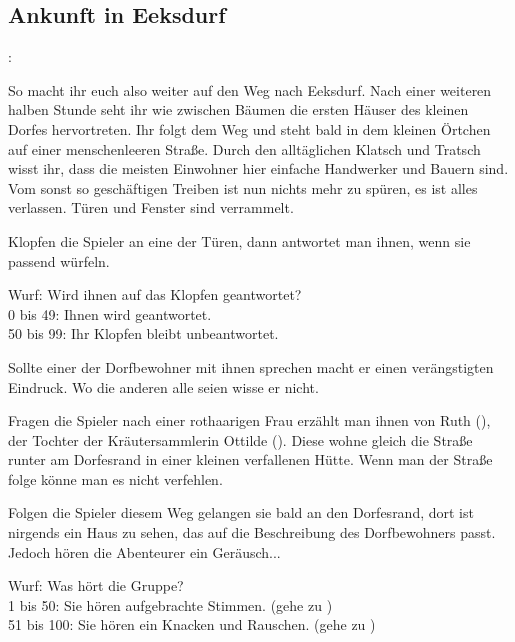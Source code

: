 \subsection*{Ankunft in Eeksdurf}
\label{inxd}

:

So macht ihr euch also weiter auf den Weg nach Eeksdurf. Nach einer weiteren halben Stunde seht ihr wie zwischen Bäumen die ersten Häuser des kleinen Dorfes hervortreten. Ihr folgt dem Weg und steht bald in dem kleinen Örtchen auf einer menschenleeren Straße. Durch den alltäglichen Klatsch und Tratsch wisst ihr, dass die meisten Einwohner hier einfache Handwerker und Bauern sind. Vom sonst so geschäftigen Treiben ist nun nichts mehr zu spüren, es ist alles verlassen. Türen und Fenster sind verrammelt.

Klopfen die Spieler an eine der Türen, dann antwortet man ihnen, wenn sie passend würfeln.

\begin{tcolorbox}
  Wurf: Wird ihnen auf das Klopfen geantwortet? \\
  0 bis 49: Ihnen wird geantwortet. \\
  50 bis 99: Ihr Klopfen bleibt unbeantwortet.\\
\end{tcolorbox}

Sollte einer der Dorfbewohner mit ihnen sprechen macht er einen verängstigten Eindruck. Wo die anderen alle seien wisse er nicht.


Fragen die Spieler nach einer rothaarigen Frau erzählt man ihnen von Ruth (\blue{\ref{Ruth}}), der Tochter der Kräutersammlerin Ottilde (\blue{\ref{Ottilde}}). Diese wohne gleich die Straße runter am Dorfesrand in einer kleinen verfallenen Hütte. Wenn man der Straße folge könne man es nicht verfehlen.


Folgen die Spieler diesem Weg gelangen sie bald an den Dorfesrand, dort ist nirgends ein Haus zu sehen, das auf die Beschreibung des Dorfbewohners passt. Jedoch hören die Abenteurer ein Geräusch...

\begin{tcolorbox}
  Wurf: Was hört die Gruppe? \\
  1 bis 50: Sie hören aufgebrachte Stimmen. (gehe zu \blue{\ref{mob}})\\
  51 bis 100: Sie hören ein Knacken und Rauschen. (gehe zu \blue{\ref{feuer}})\\
\end{tcolorbox}

